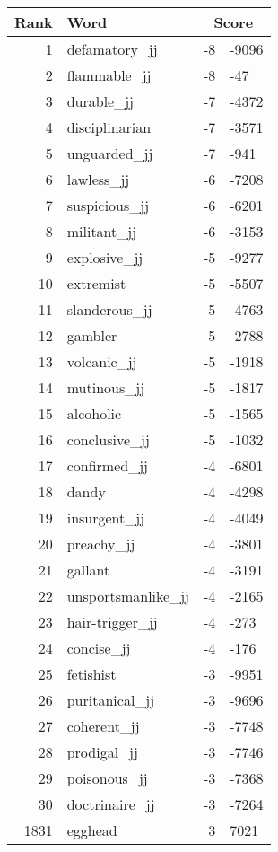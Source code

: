 \begin{longtable}[!htbp]{| rlr@{.}l |}
    \hline
    \textbf{Rank} & \textbf{Word} & \multicolumn{2}{c|}{\textbf{Score}} \\
    \hline
    \endhead
    1 & defamatory\_jj & -8 & -9096 \\
    2 & flammable\_jj & -8 & -47 \\
    3 & durable\_jj & -7 & -4372 \\
    4 & disciplinarian & -7 & -3571 \\
    5 & unguarded\_jj & -7 & -941 \\
    6 & lawless\_jj & -6 & -7208 \\
    7 & suspicious\_jj & -6 & -6201 \\
    8 & militant\_jj & -6 & -3153 \\
    9 & explosive\_jj & -5 & -9277 \\
    10 & extremist & -5 & -5507 \\
    11 & slanderous\_jj & -5 & -4763 \\
    12 & gambler & -5 & -2788 \\
    13 & volcanic\_jj & -5 & -1918 \\
    14 & mutinous\_jj & -5 & -1817 \\
    15 & alcoholic & -5 & -1565 \\
    16 & conclusive\_jj & -5 & -1032 \\
    17 & confirmed\_jj & -4 & -6801 \\
    18 & dandy & -4 & -4298 \\
    19 & insurgent\_jj & -4 & -4049 \\
    20 & preachy\_jj & -4 & -3801 \\
    21 & gallant & -4 & -3191 \\
    22 & unsportsmanlike\_jj & -4 & -2165 \\
    23 & hair-trigger\_jj & -4 & -273 \\
    24 & concise\_jj & -4 & -176 \\
    25 & fetishist & -3 & -9951 \\
    26 & puritanical\_jj & -3 & -9696 \\
    27 & coherent\_jj & -3 & -7748 \\
    28 & prodigal\_jj & -3 & -7746 \\
    29 & poisonous\_jj & -3 & -7368 \\
    30 & doctrinaire\_jj & -3 & -7264 \\
    1831 & egghead & 3 & 7021 \\

\end{longtable}

